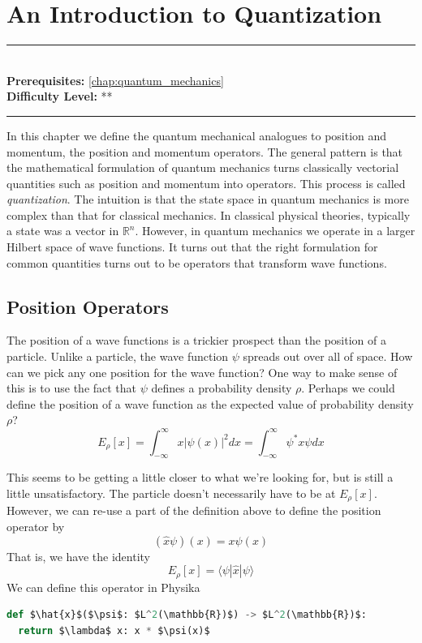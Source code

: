\documentclass[book.tex]{subfiles}
\begin{document}
\chapter{An Introduction to Quantization}

\label{chap:position_and_momentum}
\noindent\rule{11cm}{0.4pt} \\
\textbf{Prerequisites:}  \autoref{chap:quantum_mechanics} \\
\textbf{Difficulty Level:} ** \\
\noindent\rule{11cm}{0.4pt}
\vspace{5mm}

In this chapter we define the quantum mechanical analogues to position and momentum, the position and momentum operators. The general pattern is that the mathematical formulation of quantum mechanics turns classically vectorial quantities such as position and momentum into operators. This process is called \textit{quantization}. The intuition is that the state space in quantum mechanics is more complex than that for classical mechanics. In classical physical theories, typically a state was a vector in $\mathbb{R}^n$. However, in quantum mechanics we operate in a larger Hilbert space of wave functions. It turns out that the right formulation for common quantities turns out to be operators that transform wave functions.

\section{Position Operators}

The position of a wave functions is a trickier prospect than the position of a particle. Unlike a particle, the wave function $\psi$ spreads out over all of space. How can we pick any one position for the wave function? One way to make sense of this is to use the fact that $\psi$ defines a probability density $\rho$. Perhaps we could define the position of a wave function as the expected value of probability density $\rho$?
\begin{equation}
    E_\rho[x] = \int_{-\infty}^{\infty} x |\psi(x)|^2 dx = \int_{-\infty}^{\infty} \psi^* x \psi dx
\end{equation}

This seems to be getting a little closer to what we're looking for, but is still a little unsatisfactory. The particle doesn't necessarily have to be at $E_\rho[x]$. However, we can re-use a part of the definition above to define the position operator by
\begin{equation}
    (\hat{x} \psi)(x) = x \psi(x)
\end{equation}
That is, we have the identity
\begin{equation}
    E_\rho[x] = \langle \psi | \hat{x} | \psi \rangle
\end{equation}
We can define this operator in Physika
\begin{lstlisting}[language=python]
def $\hat{x}$($\psi$: $L^2(\mathbb{R})$) -> $L^2(\mathbb{R})$:
  return $\lambda$ x: x * $\psi(x)$
\end{lstlisting}
\end{document}
